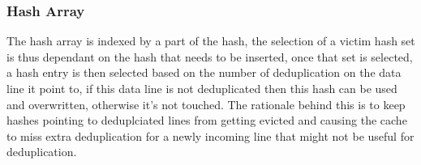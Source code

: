 \subsubsection{Hash Array}
\label{sssec:DedupBDIHash}
The hash array is indexed by a part of the hash, the selection of a victim hash set is thus dependant on the hash that needs to be inserted, once that set is selected, a hash entry is then selected based on the number of deduplication on the data line it point to, if this data line is not deduplicated then this hash can be used and overwritten, otherwise it's not touched. The rationale behind this is to keep hashes pointing to deduplciated lines from getting evicted and causing the cache to miss extra deduplication for a newly incoming line that might not be useful for deduplication.




